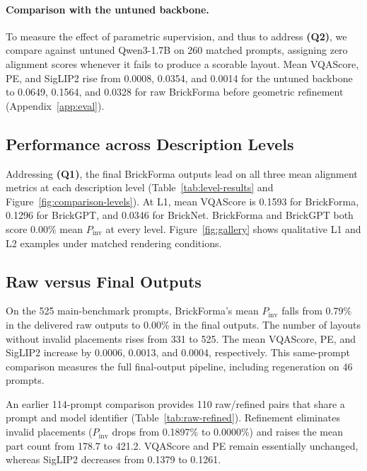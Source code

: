 \paragraph{Comparison with the untuned backbone.}
To measure the effect of parametric supervision, and thus to address \textbf{(Q2)}, we compare against untuned Qwen3-1.7B on 260 matched prompts, assigning zero alignment scores whenever it fails to produce a scorable layout. Mean VQAScore, PE, and SigLIP2 rise from 0.0008, 0.0354, and 0.0014 for the untuned backbone to 0.0649, 0.1564, and 0.0328 for raw BrickForma before geometric refinement (Appendix~\ref{app:eval}).

\subsection{Performance across Description Levels}

Addressing \textbf{(Q1)}, the final BrickForma outputs lead on all three mean alignment metrics at each description level (Table~\ref{tab:level-results} and Figure~\ref{fig:comparison-levels}). At L1, mean VQAScore is 0.1593 for BrickForma, 0.1296 for BrickGPT, and 0.0346 for BrickNet. BrickForma and BrickGPT both score 0.00\% mean $P_{\mathrm{inv}}$ at every level. Figure~\ref{fig:gallery} shows qualitative L1 and L2 examples under matched rendering conditions.



\subsection{Raw versus Final Outputs}
On the 525 main-benchmark prompts, BrickForma's mean $P_{\mathrm{inv}}$ falls from 0.79\% in the delivered raw outputs to 0.00\% in the final outputs. The number of layouts without invalid placements rises from 331 to 525. The mean VQAScore, PE, and SigLIP2 increase by 0.0006, 0.0013, and 0.0004, respectively. This same-prompt comparison measures the full final-output pipeline, including regeneration on 46 prompts.


An earlier 114-prompt comparison provides 110 raw/refined pairs that share a prompt and model identifier (Table~\ref{tab:raw-refined}). Refinement eliminates invalid placements ($P_{\mathrm{inv}}$ drops from 0.1897\% to 0.0000\%) and raises the mean part count from 178.7 to 421.2. VQAScore and PE remain essentially unchanged, whereas SigLIP2 decreases from 0.1379 to 0.1261.

